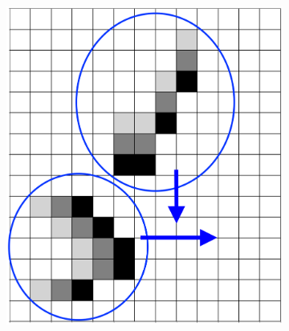 \documentclass[12pt]{article}
\numberwithin{figure}{section} %
\begin{document}
\begin{figure}[H]
	\begin{subfigure}{0.24\textwidth}
     		\includegraphics[width=\linewidth]{Section4/36.0}
     		\subcaption{}
   	\end{subfigure}
    	\begin{subfigure}{0.24\textwidth}

\end{subfigure}
\end{figure}
\end{document}
